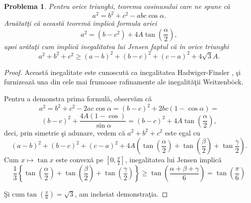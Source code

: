 \documentclass[a4paper,12pt,oneside]{report}
\newtheorem{problem}{Problema}
\begin{document}
\begin{problem}
Pentru orice triunghi, teorema cosinusului care ne spune c\u{a}
\begin{displaymath}
  a^{2} = b^{2}+ c^{2} - abc\cos\alpha.
\end{displaymath}
Ara\u{a}tat\c{t}i c\u{a} aceast\u{a} teorem\u{a} implic\u{a} formula ariei
\begin{displaymath}
  a^{2} = \left ( b - c^{2} \right ) + 4 A\tan \left ( \frac{\alpha }{2} \right ),
\end{displaymath}
apoi ar\u{a}ta\c{t}i cum implic\u{a} inegalitatea lui Jensen faptul c\u{a} \^{i}n orice triunghi
\begin{displaymath}
  a^{2} + b^{2} + c^{2} \geq  \left ( a - b  \right )^{2} + \left ( b- c  \right )^{2} + \left ( c - a \right )^{2} + 4\sqrt{3}A.
\end{displaymath}
\end{problem}
\begin{proof}
Aceast\u{a} inegalitate este cunoscut\u{a} ca inegalitatea Hadwiger-Finsler , \c{s}i furnizeaz\u{a} una din cele mai frumoase rafinamente ale inegalit\u{a}\c{t}ii Weitzenböck.

Pentru a demonstra prima formul\u{a}, observ\u{a}m c\u{a}
\begin{displaymath}
  a^{2} = b^{2} + c^{2} - 2ac\cos\alpha  = \left (  b - c \right )^{2} + 2bc\left ( 1 - \cos\alpha  \right )=
\end{displaymath}
\begin{displaymath}
 \left ( b - c \right )^{2} + \frac{4A\left ( 1 - \cos  \right )}{\sin \alpha } = \left ( b - c \right )^{2} + 4A\tan\left ( \frac{\alpha }{2} \right ),
\end{displaymath}
deci, prin simetrie \c{s}i adunare, vedem c\u{a}
\(a^{2} + b^{2} + c^{2}\) este egal cu
\begin{displaymath}
  \left ( a - b  \right )^{2} + \left ( b - c \right )^{2} + \left ( c - a  \right )^{2} + 4A\left ( \tan\left ( \frac{\alpha }{2} \right ) + \tan\left ( \frac{\beta }{2} \right ) + \tan \frac{\gamma }{2} \right ).
\end{displaymath}
	Cum \(x \mapsto \tan x\) este convex\u{a} pe \(\left [ 0 , \frac{\pi }{2} \right ]\), inegalitatea lui Jensen implic\u{a}
\begin{displaymath}
  \frac{1}{3}\left \{ \tan \left ( \frac{\alpha }{2} \right ) + \tan \left ( \frac{\beta }{2} \right )  + \tan \left ( \frac{\gamma }{2} \right )\right \} \geq  \tan\left ( \frac{\alpha  + \beta  + \gamma }{6} \right ) = \tan \left ( \frac{\pi }{6} \right)
\end{displaymath}

\c{S}i cum\(\tan \left ( \frac{\pi }{6} \right ) = \sqrt{3}\),  am incheiat demonstra\c{t}ia.
\end{proof}
\end{document}
